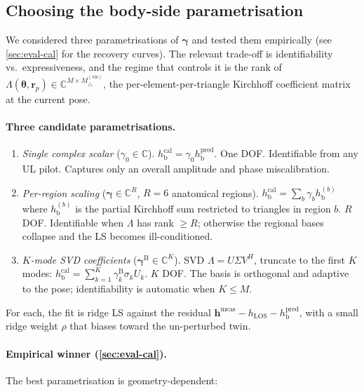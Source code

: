\documentclass[11pt,a4paper]{article}
\theoremstyle{definition}
\newcommand{\rr}{\mathbf{r}}
\newcommand{\Complex}{\mathbb{C}}
\newcommand{\hh}{\mathbf{h}}
\newcommand{\thetab}{\bm{\theta}}
\newcommand{\gammab}{\bm{\gamma}}
\newcommand{\hbody}{h_{\mathrm{b}}}
\newcommand{\hLOS}{h_{\mathrm{LOS}}}
\begin{document}
\subsection{Choosing the body-side parametrisation}\label{sec:gamma-choice}

We considered three parametrisations of $\bm\gamma$ and tested them
empirically (see \cref{sec:eval-cal} for the recovery curves).
The relevant trade-off is identifiability vs.\ expressiveness, and
the regime that controls it is the rank of
$\Lambda(\thetab,\rr_p)\in\Complex^{M\times M_\triangle^{(\mathrm{vis})}}$,
the per-element-per-triangle Kirchhoff coefficient matrix at the
current pose.

\paragraph{Three candidate parametrisations.}
\begin{enumerate}[leftmargin=1.6em,itemsep=2pt]
\item \emph{Single complex scalar} ($\gamma_0\in\Complex$).
$\hbody^{\mathrm{cal}}=\gamma_0\hbody^{\mathrm{pred}}$.  One DOF.
Identifiable from any UL pilot.  Captures only an overall amplitude
and phase miscalibration.
\item \emph{Per-region scaling} ($\gammab\in\Complex^{R}$, $R=6$
anatomical regions).  $\hbody^{\mathrm{cal}}=\sum_b\gamma_b
\hbody^{(b)}$ where $\hbody^{(b)}$ is the partial Kirchhoff sum
restricted to triangles in region $b$.  $R$ DOF.  Identifiable when
$\Lambda$ has rank $\ge R$; otherwise the regional bases collapse
and the LS becomes ill-conditioned.
\item \emph{$K$-mode SVD coefficients} ($\bm\gamma^{\mathrm{B}}\in\Complex^K$).
SVD $\Lambda=U\Sigma V^H$, truncate to the first $K$ modes:
$\hbody^{\mathrm{cal}}=\sum_{k=1}^K\gamma_k^{\mathrm{B}}
\sigma_k U_k$.  $K$ DOF.  The basis is orthogonal and adaptive to
the pose; identifiability is automatic when $K\le M$.
\end{enumerate}
For each, the fit is ridge LS against the residual
$\hh^{\mathrm{meas}}-\hLOS-\hbody^{\mathrm{pred}}$, with a small
ridge weight $\rho$ that biases toward the un-perturbed twin.

\paragraph{Empirical winner (\cref{sec:eval-cal}).}
The best parametrisation is geometry-dependent:
\end{document}
